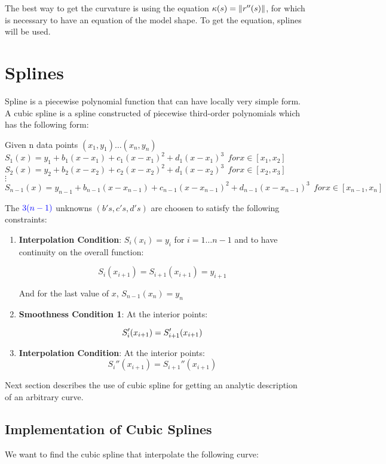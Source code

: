 \documentclass{ws-procs9x6}
\begin{document}
The best way to get the curvature is using the equation $\kappa(s) =
\lVert r\sp{\prime\prime}(s) \rVert$, for which is necessary to have
an equation of the model shape.
To get the equation, splines will be used.


\section{Splines}
Spline is a piecewise polynomial function that can have locally very
simple form.  
A cubic spline is a spline constructed of piecewise third-order
polynomials which has the following form:

Given n data points $(x_{1},y_{1}) \ldots (x_n,y_n)$\\
$S_{1}(x) = y_{1} + b_{1}(x-x_{1}) + c_{1}(x-x_{1})^{2} + d_{1}(x-x_{1})^{3} \ \ for x \in [x_{1},x_{2}]$\\
$S_{2}(x) = y_{2} + b_{2}(x-x_{2}) + c_{2}(x-x_{2})^{2} + d_{1}(x-x_{2})^{3} \ \ for x \in [x_{2},x_{3}]$\\
$\vdots$\\
$S_{n-1}(x) = y_{n-1} + b_{n-1}(x-x_{n-1}) + c_{n-1}(x-x_{n-1})^{2} + d_{n-1}(x-x_{n-1})^{3} \ \ for x \in [x_{n-1},x_{n}]$

The ${\color{blue}3(n-1)}$ unknowns $(b's, c's, d's)$ are choosen to satisfy the
following constraints:

\begin{enumerate}
\item \textbf{Interpolation Condition}: $S_{i}(x_{i})=y_{i}$ for $i=1
  \ldots n-1$ and to have continuity on the overall function:

$$S_{i}(x_{i+1})=S_{i+1}(x_{i+1})=y_{i+1}$$

And for the last value of $x$, $S_{n-1}(x_{n})=y_{n}$

\item \textbf{Smoothness Condition 1}: At the interior points:

$$S_{i}\sp{\prime}(x_{i+1})=S_{i+1}'(x_{i+1})$$

\item \textbf{Interpolation Condition}: At the interior points:
$$S_{i}''(x_{i+1})=S_{i+1}''(x_{i+1})$$

\end{enumerate}

Next section describes the use of cubic spline for getting an analytic
description of an arbitrary curve.

\subsection{Implementation of Cubic Splines}
We want to find the cubic spline that interpolate the following curve:
\begin{figure}
\centering
{}
\end{figure}
\end{document}
